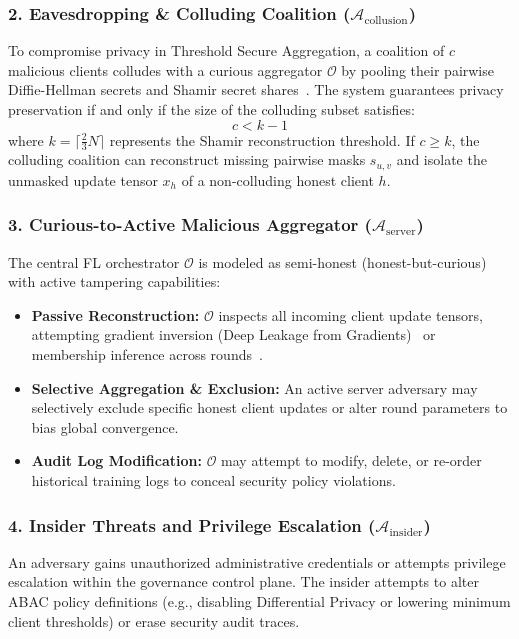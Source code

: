 \subsubsection{2. Eavesdropping \& Colluding Coalition ($\mathcal{A}_{\text{collusion}}$)}
To compromise privacy in Threshold Secure Aggregation, a coalition of $c$ malicious clients colludes with a curious aggregator $\mathcal{O}$ by pooling their pairwise Diffie-Hellman secrets and Shamir secret shares~\cite{bonawitz2017practical}. The system guarantees privacy preservation if and only if the size of the colluding subset satisfies:
\begin{equation}
    c < k - 1
\end{equation}
where $k = \lceil \frac{2}{3} N \rceil$ represents the Shamir reconstruction threshold. If $c \ge k$, the colluding coalition can reconstruct missing pairwise masks $s_{u,v}$ and isolate the unmasked update tensor $x_h$ of a non-colluding honest client $h$.

\subsubsection{3. Curious-to-Active Malicious Aggregator ($\mathcal{A}_{\text{server}}$)}
The central FL orchestrator $\mathcal{O}$ is modeled as semi-honest (honest-but-curious) with active tampering capabilities:
\begin{itemize}
    \item \textbf{Passive Reconstruction:} $\mathcal{O}$ inspects all incoming client update tensors, attempting gradient inversion (Deep Leakage from Gradients)~\cite{zhu2019deep, geiping2020inverting} or membership inference across rounds~\cite{shokri2017membership}.
    \item \textbf{Selective Aggregation \& Exclusion:} An active server adversary may selectively exclude specific honest client updates or alter round parameters to bias global convergence.
    \item \textbf{Audit Log Modification:} $\mathcal{O}$ may attempt to modify, delete, or re-order historical training logs to conceal security policy violations.
\end{itemize}

\subsubsection{4. Insider Threats and Privilege Escalation ($\mathcal{A}_{\text{insider}}$)}
An adversary gains unauthorized administrative credentials or attempts privilege escalation within the governance control plane. The insider attempts to alter ABAC policy definitions (e.g., disabling Differential Privacy or lowering minimum client thresholds) or erase security audit traces.

